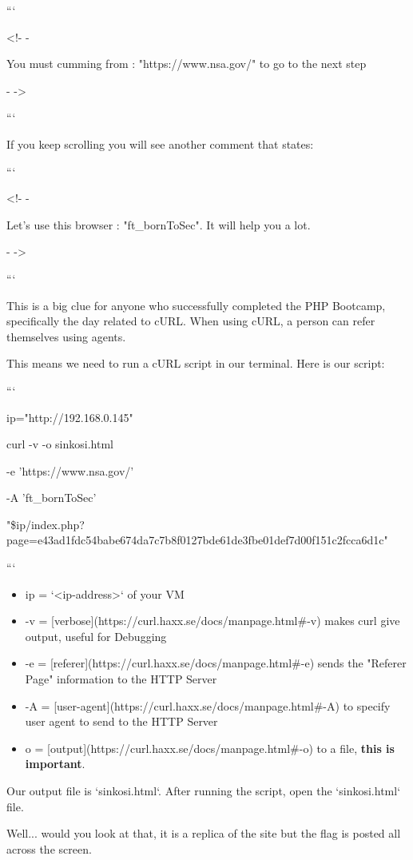 ```

<!- -

You must cumming from : "https://www.nsa.gov/" to go to the next step

- ->

```

If you keep scrolling you will see another comment that states:

```

<!- -

Let's use this browser : "ft\_bornToSec". It will help you a lot.

- ->

```

This is a big clue for anyone who successfully completed the PHP Bootcamp, specifically the day related to cURL. When using cURL, a person can refer themselves using agents.

This means we need to run a cURL script in our terminal. Here is our script:

```

ip="http://192.168.0.145"

curl -v -o sinkosi.html \

-e 'https://www.nsa.gov/' \

-A 'ft\_bornToSec' \

"\${ip}/index.php?page=e43ad1fdc54babe674da7c7b8f0127bde61de3fbe01def7d00f151c2fcca6d1c"\

```
\begin{itemize}
    \item ip = `<ip-address>` of your VM
    \item -v = [verbose](https://curl.haxx.se/docs/manpage.html\#-v) makes curl give output, useful for Debugging
    \item -e = [referer](https://curl.haxx.se/docs/manpage.html\#-e) sends the "Referer Page" information to the HTTP Server
    \item -A = [user-agent](https://curl.haxx.se/docs/manpage.html\#-A) to specify user agent to send to the HTTP Server
    \item o = [output](https://curl.haxx.se/docs/manpage.html\#-o) to a file, \textbf{this is important}.
\end{itemize}

Our output file is `sinkosi.html`.
After running the script, open the `sinkosi.html` file.

Well... would you look at that, it is a replica of the site but the flag is posted all across the screen.

